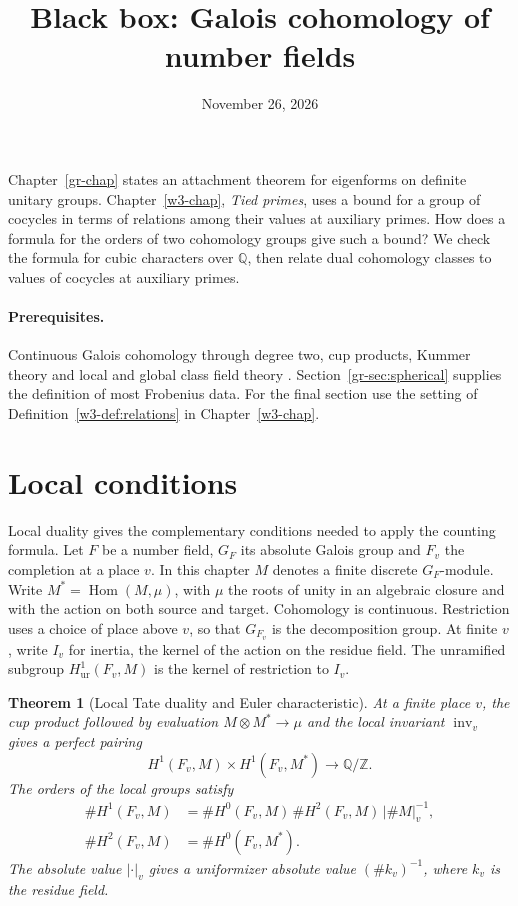 \documentclass[reqno]{amsart}
\title{Black box: Galois cohomology of number fields}
\author{}
\date{November 26, 2026}
\newcounter{chap}
\theoremstyle{definition}
\theoremstyle{plain}
\newtheorem{theorem}{Theorem}[section]
\newcommand{\Q}{\mathbb Q}
\newcommand{\Z}{\mathbb Z}
\newcommand{\inv}{\operatorname{inv}}
\newcommand{\ur}{\mathrm{ur}}
\begin{document}
\maketitle
{}\label{chap}

Chapter~\ref{gr-chap} states an attachment theorem for eigenforms on
definite unitary groups.  Chapter~\ref{w3-chap}, \emph{Tied primes},
uses a bound for a group of cocycles in terms of relations among
their values at auxiliary primes.  How does a formula for the orders of two cohomology groups give
such a bound?  We check the formula for cubic characters over \(\Q\), then
relate dual cohomology classes to values of cocycles at auxiliary primes.

\paragraph{Prerequisites.}
Continuous Galois cohomology through degree two, cup products, Kummer
theory and local and global class field theory \cite{NSW,CFT}.
Section~\ref{gr-sec:spherical} supplies the definition of most Frobenius
data.  For the final section use the setting of
Definition~\ref{w3-def:relations} in Chapter~\ref{w3-chap}.

\section{Local conditions}\label{sec:local}

Local duality gives the complementary conditions needed to apply the
counting formula.  Let \(F\) be a number field, \(G_F\) its absolute
Galois group and \(F_v\) the completion at a place \(v\).  In this
chapter \(M\) denotes a finite discrete \(G_F\)-module.  Write \(M^*=\operatorname{Hom}(M,\mu)\), with
\(\mu\) the roots of unity in an algebraic closure and with the action
on both source and target.  Cohomology is continuous.  Restriction
uses a choice of place above \(v\), so that \(G_{F_v}\) is the
decomposition group.  At finite \(v\), write \(I_v\) for inertia, the
kernel of the action on the residue field.  The unramified subgroup
\(H^1_{\ur}(F_v,M)\) is the kernel of restriction to \(I_v\).

\begin{theorem}[Local Tate duality and Euler characteristic]\label{thm:local-duality}
At a finite place \(v\), the cup product followed by evaluation
\(M\otimes M^*\to\mu\) and the local invariant \(\inv_v\) gives a perfect
pairing
\[
  H^1(F_v,M)\times H^1(F_v,M^*)\longrightarrow \Q/\Z .
\]
The orders of the local groups satisfy
\[
  \begin{aligned}
  \# H^1(F_v,M)&=\# H^0(F_v,M)\,\# H^2(F_v,M)\,|\#M|_v^{-1},\\
  \# H^2(F_v,M)&=\# H^0(F_v,M^*).
  \end{aligned}
\]
The absolute value \(|\cdot|_v\) gives a uniformizer absolute value
\((\#k_v)^{-1}\), where \(k_v\) is the residue field.
\end{theorem}
\end{document}
